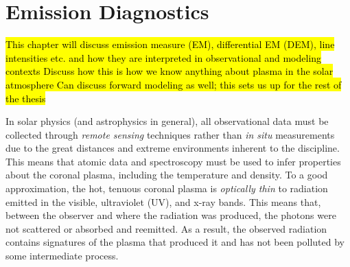 \chapter{Emission Diagnostics}
\label{ch:emission}
\hl{This chapter will discuss emission measure (EM), differential EM (DEM), line intensities etc.
and how they are interpreted in observational and modeling contexts
Discuss how this is how we know anything about plasma in the solar atmosphere
Can discuss forward modeling as well; this sets us up for the rest of the thesis}
%
\par In solar physics (and astrophysics in general), all observational data must be collected through \textit{remote sensing} techniques rather than \textit{in situ} measurements due to the great distances and extreme environments inherent to the discipline. This means that atomic data and spectroscopy must be used to infer properties about the coronal plasma, including the temperature and density. To a good approximation, the hot, tenuous coronal plasma is \textit{optically thin} to radiation emitted in the visible, ultraviolet (UV), and x-ray bands. This means that, between the observer and where the radiation was produced, the photons were not scattered or absorbed and reemitted. As a result, the observed radiation contains signatures of the plasma that produced it and has not been polluted by some intermediate process.
%

